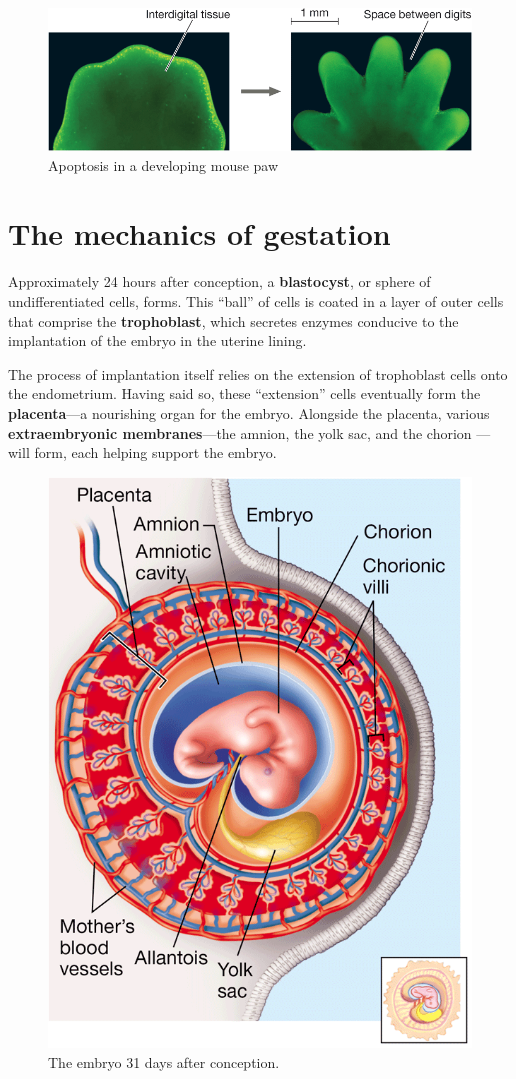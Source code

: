 \documentclass{article}
\begin{document}
\begin{figure}[h]
	\centering
	\includegraphics[width=.8\linewidth]{mouse_paw_apoptosis.png}
	\caption{Apoptosis in a developing mouse paw}
\end{figure}

\section{The mechanics of gestation}

Approximately 24 hours after conception, a \textbf{blastocyst}, or sphere of
undifferentiated cells, forms. This ``ball'' of cells is coated in a layer of
outer cells that comprise the \textbf{trophoblast}, which secretes enzymes
conducive to the implantation of the embryo in the uterine lining.

The process of implantation itself relies on the extension of trophoblast cells
onto the endometrium. Having said so, these ``extension'' cells eventually form
the \textbf{placenta}---a nourishing organ for the embryo. Alongside the placenta,
various \textbf{extraembryonic membranes}---the amnion, the yolk sac, and the chorion
---will form, each helping support the embryo.

\bigbreak

\begin{figure}[h]
	\centering
	\includegraphics[width=.475\linewidth]{placenta.png}
	\caption{The embryo 31 days after conception.}
\end{figure}
\end{document}
